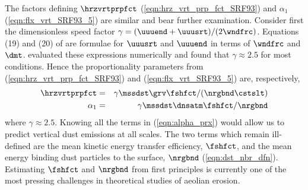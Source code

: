\documentclass[12pt,twoside]{book}
\begin{document}
The factors defining $\hrzvrtprpfct$ (\ref{eqn:hrz_vrt_prp_fct_SRF93}) 
and $\alpha_{1}$ (\ref{eqn:flx_vrt_SRF93_5}) are similar and bear
further examination.
Consider first the dimensionless speed factor   
$\gamma = (\uuuend + \uuusrt) / (2 \wndfrc) $.
Equations (19) and (20) of \cite{Owe64} are formulae for $\uuusrt$
and $\uuuend$ in terms of $\wndfrc$ and $\dmt$.
\cite{SRL96} evaluated these expressions numerically and found that
$\gamma \approx 2.5$ for most conditions. %
Hence the proportionality parameters from
(\ref{eqn:hrz_vrt_prp_fct_SRF93}) and (\ref{eqn:flx_vrt_SRF93_5}) are,
respectively, 
\begin{eqnarray}
\hrzvrtprpfct & = & \gamma \mssdst \grv \fshfct / ( \nrgbnd \cstslt ) \\
\alpha_{1} & = & \gamma \mssdst \dnsatm \fshfct / \nrgbnd 
\label{eqn:alpha_prx}
\end{eqnarray}
where $\gamma \approx 2.5$.
Knowing all the terms in (\ref{eqn:alpha_prx}) would allow 
us to predict vertical dust emissions at all scales.
The two terms which remain ill-defined are the mean kinetic energy
transfer efficiency, $\fshfct$, and the mean energy binding dust
particles to the surface, $\nrgbnd$ (\ref{eqn:dst_nbr_dfn}).  
Estimating $\fshfct$ and $\nrgbnd$ from first principles is currently
one of the most pressing challenges in theoretical studies of aeolian
erosion. 
\end{document}
